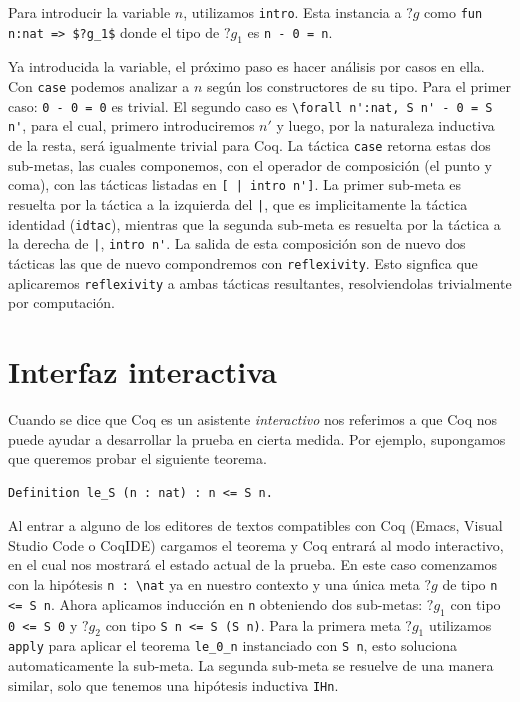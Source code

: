 Para introducir la variable $n$, utilizamos \lstinline{intro}. Esta instancia a $?g$ como \lstinline{fun n:nat => $?g_1$} donde el tipo de $?g_1$ es \lstinline{n - 0 = n}.

Ya introducida la variable, el próximo paso es hacer análisis por casos en ella. Con \lstinline{case} podemos analizar a $n$ según los constructores de su tipo. Para el primer caso: \lstinline{0 - 0 = 0} es trivial. El segundo caso es \lstinline{\forall n':nat, S n' - 0 = S n'}, para el cual, primero introduciremos $n'$ y luego, por la naturaleza inductiva de la resta, será igualmente trivial para Coq. La táctica \lstinline{case} retorna estas dos sub-metas, las cuales componemos, con el operador de composición (el punto y coma), con las tácticas listadas en \lstinline{[ | intro n']}. La primer sub-meta es resuelta por la táctica a la izquierda del \lstinline{|}, que es implicitamente la táctica identidad (\lstinline{idtac}), mientras que la segunda sub-meta es resuelta por la táctica a la derecha de \lstinline{|}, \lstinline{intro n'}. La salida de esta composición son de nuevo dos tácticas las que de nuevo compondremos con \lstinline{reflexivity}. Esto signfica que aplicaremos \lstinline{reflexivity} a ambas tácticas resultantes, resolviendolas trivialmente por computación.

\section{Interfaz interactiva}

Cuando se dice que Coq es un asistente \textit{interactivo} nos referimos a que Coq nos puede ayudar a desarrollar la prueba en cierta medida.
Por ejemplo, supongamos que queremos probar el siguiente teorema.
\begin{exmp}
\begin{lstlisting}
Definition le_S (n : nat) : n <= S n.
\end{lstlisting}
\end{exmp}
Al entrar a alguno de los editores de textos compatibles con Coq (Emacs, Visual Studio Code o CoqIDE) cargamos el teorema y Coq entrará al modo interactivo, en el cual nos mostrará el estado actual de la prueba. En este caso comenzamos con la hipótesis \lstinline{n : \nat} ya en nuestro contexto y una única meta $?g$ de tipo \lstinline{n <= S n}. Ahora aplicamos inducción en \lstinline{n} obteniendo dos sub-metas: $?g_1$ con tipo \lstinline{0 <= S 0} y $?g_2$ con tipo \lstinline{S n <= S (S n)}. Para la primera meta $?g_1$ utilizamos \lstinline{apply} para aplicar el teorema \lstinline{le_0_n} instanciado con \lstinline{S n}, esto soluciona automaticamente la sub-meta. La segunda sub-meta se resuelve de una manera similar, solo que tenemos una hipótesis inductiva \lstinline{IHn}.

